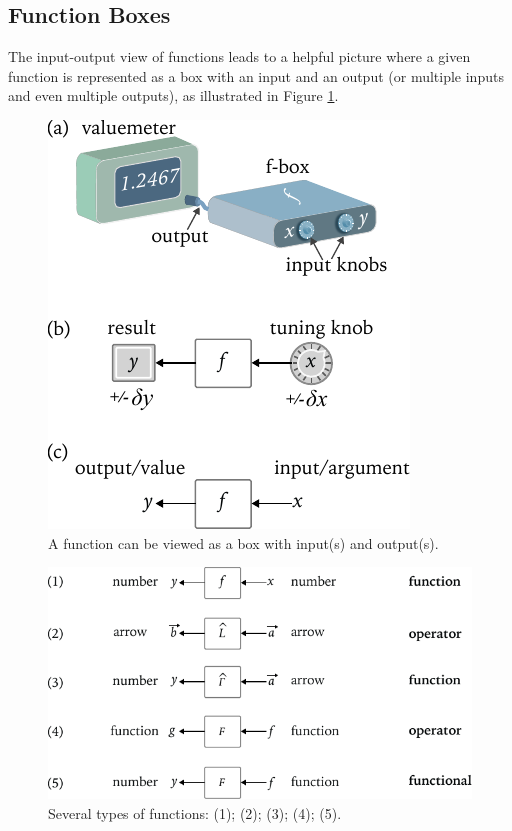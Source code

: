 \subsection{Function Boxes}
The input-output view of functions leads to a helpful picture where a given function is represented as a box with an input and an output (or multiple inputs and even multiple outputs), as illustrated in Figure \ref{fig:functionAsBox}.
\begin{figure}[htbp]
	\centering
	\includegraphics[scale=1.0]{functionAsBox}
	\caption{A function can be viewed as a box with input(s) and output(s).}
	\label{fig:functionAsBox}
\end{figure}


\begin{figure}[htbp]
	\centering
	\includegraphics[scale=1.0]{functionTypes}
	\caption{Several types of functions: (1); (2); (3); (4); (5).}
	\label{fig:functionTypes}
\end{figure}


